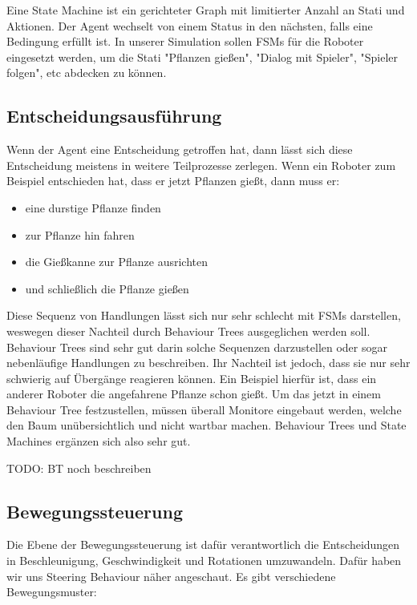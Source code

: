 Eine State Machine ist ein gerichteter Graph mit limitierter Anzahl an Stati und Aktionen. Der Agent wechselt von einem Status in den nächsten, falls eine Bedingung erfüllt ist. In unserer Simulation sollen FSMs für die Roboter eingesetzt werden, um die Stati "Pflanzen gießen", "Dialog mit Spieler", "Spieler folgen", etc abdecken zu können. 

\subsection{Entscheidungsausführung}

Wenn der Agent eine Entscheidung getroffen hat, dann lässt sich diese Entscheidung meistens in weitere Teilprozesse zerlegen. Wenn ein Roboter zum Beispiel entschieden hat, dass er jetzt Pflanzen gießt, dann muss er:

\begin{itemize}
\item eine durstige Pflanze finden
\item zur Pflanze hin fahren
\item die Gießkanne zur Pflanze ausrichten
\item und schließlich die Pflanze gießen
\end{itemize}

Diese Sequenz von Handlungen lässt sich nur sehr schlecht mit FSMs darstellen, weswegen dieser Nachteil durch Behaviour Trees ausgeglichen werden soll. Behaviour Trees sind sehr gut darin solche Sequenzen darzustellen oder sogar nebenläufige Handlungen zu beschreiben. Ihr Nachteil ist jedoch, dass sie nur sehr schwierig auf Übergänge reagieren können. Ein Beispiel hierfür ist, dass ein anderer Roboter die angefahrene Pflanze schon gießt. Um das jetzt in einem Behaviour Tree festzustellen, müssen überall Monitore eingebaut werden, welche den Baum unübersichtlich und nicht wartbar machen. Behaviour Trees und State Machines ergänzen sich also sehr gut.

TODO: BT noch beschreiben


\subsection{Bewegungssteuerung}

Die Ebene der Bewegungssteuerung ist dafür verantwortlich die Entscheidungen in Beschleunigung, Geschwindigkeit und Rotationen umzuwandeln. Dafür haben wir uns Steering Behaviour näher angeschaut. Es gibt verschiedene Bewegungsmuster:

